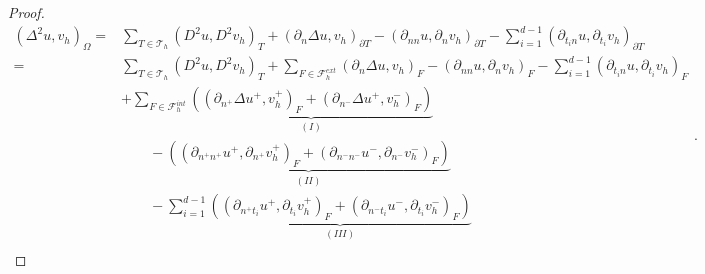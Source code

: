 \begin{proof}
\begin{equation*}
    \begin{split}
 ( \Delta  ^{2} u,v_h ) _{\Omega }  =&\sum_{T\in \mathcal{T} _{h}}^{} ( D^2u,D^2v_h ) _{T }  + (\partial _{n} \Delta  u,v_h)_{\partial T} - (\partial _{nn} u, \partial _{n}v_h )_{\partial T}  - \sum_{i=1}^{d-1} ( \partial _{t_{i}n}u , \partial _{t_{i}} v_h  )_{\partial T}   \\
= &\sum_{T\in \mathcal{T} _{h}}^{} ( D^2u,D^2v_h ) _{T }  + \sum_{F \in \mathcal{F}_{h}^{ext} }^{}  (\partial _{n} \Delta  u,v_h)_{F} - (\partial _{nn} u, \partial _{n}v_h )_{F}  - \sum_{i=1}^{d-1} ( \partial _{ t_{i}n} u , \partial _{t_{i}} v_h
)_{F}     \\
   &  + \sum_{F \in \mathcal{F} _{h}^{int}}^{} \underbrace{\left( (\partial _{n^{+}} \Delta  u^{+}
        ,v_h^{+} )_{F}
+ \left(\partial _{n^{-}} \Delta  u^{+} ,v_h^{-}\right)_{F}  \right)}_{(I)}    \\
    &\quad \quad  -
\underbrace{\left( \left(\partial _{n^{+}n^{+}} u^{+}, \partial _{n^{+}} v_h^{+} \right) _{F} + \left(\partial _{n^{-}n^{-}} u^{-}, \partial _{n^{-}} v_h^{-}
\right) _{F} \right) }_{(II)} \\
   &  \quad \quad - \sum_{i=1}^{d-1}\underbrace{( (\partial _{n^{+}t_{i}} u^{+}, \partial_{t_{i}} v_h^{+} )_{F} +  \left(\partial _{n^{-}t_{i}} u^{-},
        \partial_{t_{i}} v_h^{-}
\right)_{F} ) }_{(III)} \\
    \end{split}
.\end{equation*}


\end{proof}
